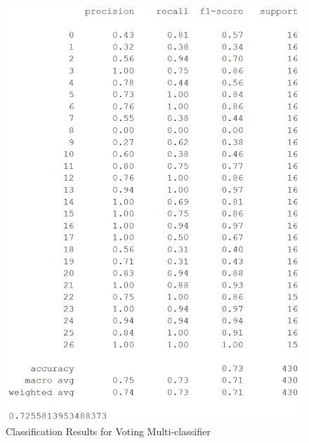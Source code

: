 \documentclass[conference]{IEEEtran}
\begin{document}
\begin{figure}[H]
\begin{center}
\includegraphics[scale=0.55]{Image/vote_27_class_report.png}
\caption{\label{vote_27_class_report} Classification Results for Voting Multi-classifier}
\end{center}
\end{figure}
\end{document}
